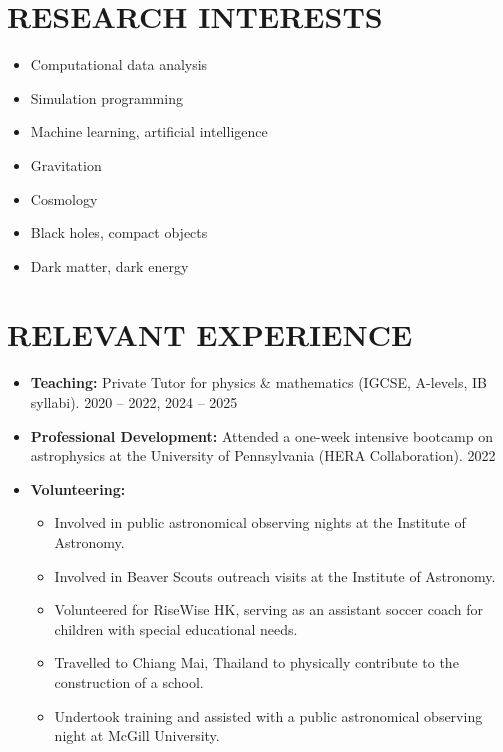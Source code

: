 \documentclass[a4paper,10pt]{extarticle}
\begin{document}
\section*{RESEARCH INTERESTS}
\begin{itemize}
    \item Computational data analysis

    \item Simulation programming

    \item Machine learning, artificial intelligence
    
    \item Gravitation

    \item Cosmology

    \item Black holes, compact objects

    \item Dark matter, dark energy
\end{itemize}


\section*{RELEVANT EXPERIENCE}
\begin{itemize}
    \item \textbf{Teaching:} Private Tutor for physics & mathematics (IGCSE, A-levels, IB syllabi). \hfill 2020 – 2022, 2024 – 2025
    \item \textbf{Professional Development:} Attended a one-week intensive bootcamp on astrophysics at the University of Pennsylvania (HERA Collaboration). \hfill 2022
    \item \textbf{Volunteering:}
    \begin{itemize}
        \item Involved in public astronomical observing nights at the Institute of Astronomy.
        \item Involved in Beaver Scouts outreach visits at the Institute of Astronomy.
        \item Volunteered for RiseWise HK, serving as an assistant soccer coach for children with special educational needs.
        \item Travelled to Chiang Mai, Thailand to physically contribute to the construction of a school.
        \item Undertook training and assisted with a public astronomical observing night at McGill University.
    \end{itemize}
\end{itemize}
\end{document}
